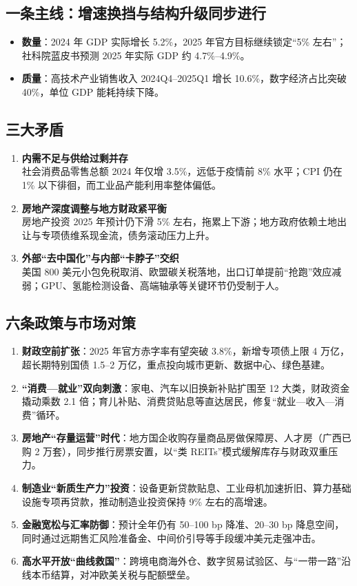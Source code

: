 \subsection{一条主线：增速换挡与结构升级同步进行}
\begin{itemize}
  \item \textbf{数量}：2024 年 GDP 实际增长 5.2\%，2025 年官方目标继续锁定“5\% 左右”；社科院蓝皮书预测 2025 年实际 GDP 约 4.7\%–4.9\%。
  \item \textbf{质量}：高技术产业销售收入 2024Q4–2025Q1 增长 10.6\%，数字经济占比突破 40\%，单位 GDP 能耗持续下降。
\end{itemize}

\subsection{三大矛盾}
\begin{enumerate}[leftmargin=*, nosep]
  \item \textbf{内需不足与供给过剩并存}\\
        社会消费品零售总额 2024 年仅增 3.5\%，远低于疫情前 8\% 水平；CPI 仍在 1\% 以下徘徊，而工业品产能利用率整体偏低。
  \item \textbf{房地产深度调整与地方财政紧平衡}\\
        房地产投资 2025 年预计仍下滑 5\% 左右，拖累上下游；地方政府依赖土地出让与专项债维系现金流，债务滚动压力上升。
  \item \textbf{外部“去中国化”与内部“卡脖子”交织}\\
        美国 800 美元小包免税取消、欧盟碳关税落地，出口订单提前“抢跑”效应减弱；GPU、氢能检测设备、高端轴承等关键环节仍受制于人。
\end{enumerate}

\subsection{六条政策与市场对策}
\begin{enumerate}[leftmargin=*, nosep]
  \item \textbf{财政空前扩张}：2025 年官方赤字率有望突破 3.8\%，新增专项债上限 4 万亿，超长期特别国债 1.5–2 万亿，重点投向城市更新、数据中心、绿色基建。
  \item \textbf{“消费—就业”双向刺激}：家电、汽车以旧换新补贴扩围至 12 大类，财政资金撬动乘数 2.1 倍；育儿补贴、消费贷贴息等直达居民，修复“就业—收入—消费”循环。
  \item \textbf{房地产“存量运营”时代}：地方国企收购存量商品房做保障房、人才房（广西已购 2 万套），同步推行房票安置，以“类 REITs”模式缓解库存与财政双重压力。
  \item \textbf{制造业“新质生产力”投资}：设备更新贷款贴息、工业母机加速折旧、算力基础设施专项再贷款，推动制造业投资保持 9\% 左右的高增速。
  \item \textbf{金融宽松与汇率防御}：预计全年仍有 50–100 bp 降准、20–30 bp 降息空间，同时通过远期售汇风险准备金、中间价引导等手段缓冲美元走强冲击。
  \item \textbf{高水平开放“曲线救国”}：跨境电商海外仓、数字贸易试验区、与“一带一路”沿线本币结算，对冲欧美关税与配额壁垒。
\end{enumerate}

